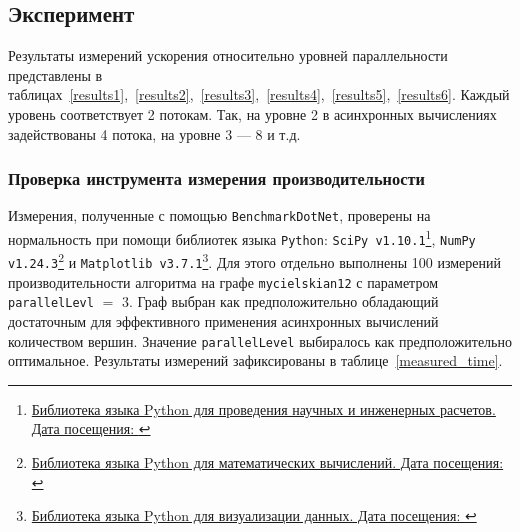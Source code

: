 \subsection{Эксперимент}
\noindent Результаты измерений ускорения относительно уровней параллельности представлены в таблицах~\ref{results1},~\ref{results2},~\ref{results3},~\ref{results4},~\ref{results5},~\ref{results6}. Каждый уровень соответствует 2 потокам. Так, на уровне 2 в асинхронных вычислениях задействованы 4 потока, на уровне 3 --- 8 и т.д. 

\subsubsection*{Проверка инструмента измерения производительности}
\noindent  Измерения, полученные с помощью \texttt{BenchmarkDotNet}, проверены на нормальность при помощи библиотек языка \texttt{Python}: \texttt{SciPy v1.10.1}\footnote{\href{https://scipy.org/}{Библиотека языка Python для проведения научных и инженерных расчетов. Дата посещения: }}, \texttt{NumPy v1.24.3}\footnote{\href{https://numpy.org/}{Библиотека языка Python для математических вычислений. Дата посещения: }} и \texttt{Matplotlib v3.7.1}\footnote{\href{https://matplotlib.org/}{Библиотека языка Python для визуализации данных. Дата посещения: }}. Для этого отдельно выполнены 100 измерений производительности алгоритма на графе \texttt{mycielskian12} с параметром \texttt{parallelLevl} $=$ 3. Граф выбран как предположительно обладающий достаточным для эффективного применения асинхронных вычислений количеством вершин. Значение \texttt{parallelLevel} выбиралось как предположительно оптимальное. Результаты измерений зафиксированы в таблице~\ref{measured_time}.

